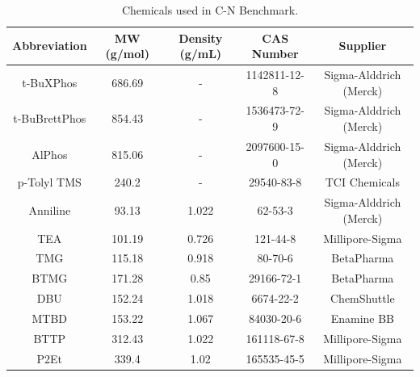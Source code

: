 \begin{table}[]
\begin{tabular}{ccccc}
\textbf{Abbreviation}             & \textbf{MW (g/mol)} & \textbf{Density (g/mL)} & \textbf{CAS Number} & \textbf{Supplier} \\
\hline
t-BuXPhos     & 686.69 & -     & 1142811-12-8 & Sigma-Alddrich (Merck) \\
t-BuBrettPhos & 854.43 & -     & 1536473-72-9 & Sigma-Alddrich (Merck) \\
AlPhos        & 815.06 & -     & 2097600-15-0 & Sigma-Alddrich (Merck) \\
p-Tolyl TMS   & 240.2               & -                       & 29540-83-8          & TCI Chemicals     \\
Anniline      & 93.13  & 1.022 & 62-53-3      & Sigma-Alddrich (Merck) \\
TEA           & 101.19 & 0.726 & 121-44-8     & Millipore-Sigma        \\
TMG           & 115.18 & 0.918 & 80-70-6      & BetaPharma             \\
BTMG          & 171.28 & 0.85  & 29166-72-1   & BetaPharma             \\
DBU           & 152.24 & 1.018 & 6674-22-2    & ChemShuttle            \\
MTBD          & 153.22 & 1.067 & 84030-20-6   & Enamine BB             \\
BTTP          & 312.43 & 1.022 & 161118-67-8  & Millipore-Sigma        \\
P2Et          & 339.4  & 1.02  & 165535-45-5  & Millipore-Sigma       
\end{tabular}
\caption{Chemicals used in C-N Benchmark.}
\label{tab:cn_benchmark_prices_1}
\end{table}

